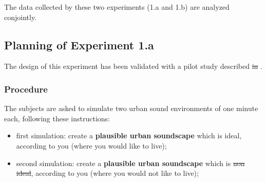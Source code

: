 \documentclass[12pt]{elsarticle}
\providecommand{\DIFadd}[1]{{\protect\color{blue}\uwave{#1}}} %
\providecommand{\DIFdel}[1]{{\protect\color{red}\sout{#1}}}                      %
\providecommand{\DIFaddbegin}{} %
\providecommand{\DIFaddend}{} %
\providecommand{\DIFdelbegin}{} %
\providecommand{\DIFdelend}{} %
\begin{document}

The data collected by these two experiments (1.a and 1.b) are analyzed conjointly.

\subsection{Planning of Experiment 1.a}
\label{sec:xp1a_plan}

The design of this experiment has been validated with a pilot study described \DIFdelbegin \DIFdel{in }\DIFdelend \DIFaddbegin \DIFadd{by~}\DIFaddend \cite{lafay2014new}.

\subsubsection*{Procedure}


The subjects are asked to simulate two urban sound environments of one minute each, following these instructions:


 \begin{itemize} 
\item  first simulation: create a \textbf{plausible urban soundscape} which is ideal, according to you (where you would like to live);
\item second simulation: create a \textbf{plausible urban soundscape} which is \DIFdelbegin \DIFdel{non ideal}\DIFdelend \DIFaddbegin \DIFadd{non-ideal}\DIFaddend , according to you (where you would not like to live);
 \end{itemize} 


\end{document}
